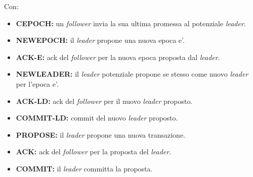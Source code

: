 \documentclass{article}
\begin{document}
Con:
\begin{itemize}
    \item \textbf{CEPOCH:} un \textit{follower} invia la sua ultima promessa al potenziale \textit{leader}.
    \item \textbf{NEWEPOCH:} il \textit{leader} propone una nuova epoca e'.
    \item \textbf{ACK-E:} ack del \textit{follower} per la nuova epoca proposta dal \textit{leader}.
    \item \textbf{NEWLEADER:} il \textit{leader} potenziale propone se stesso come nuovo \textit{leader} per l'epoca e'.
    \item \textbf{ACK-LD:} ack del \textit{follower} per il nuovo \textit{leader} proposto.
    \item \textbf{COMMIT-LD:} commit del nuovo \textit{leader} proposto.
    \item \textbf{PROPOSE:} il \textit{leader} propone una nuova transazione.
    \item \textbf{ACK:} ack del \textit{follower} per la proposta del \textit{leader}.
    \item \textbf{COMMIT:} il \textit{leader} committa la proposta.
\end{itemize}
\end{document}
